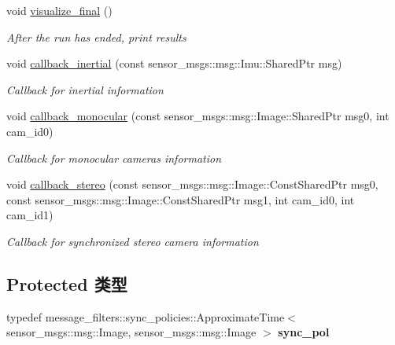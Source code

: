 \begin{DoxyCompactItemize}
void \hyperlink{classov__msckf_1_1ROS2Visualizer_a9126120133a9b4e329c55f0b84c6cf37}{visualize\+\_\+final} ()
\begin{DoxyCompactList}\small\item\em After the run has ended, print results \end{DoxyCompactList}\item 
\mbox{\label{classov__msckf_1_1ROS2Visualizer_afd07ffaa161451684954a6b890de9848}} 
void \hyperlink{classov__msckf_1_1ROS2Visualizer_afd07ffaa161451684954a6b890de9848}{callback\+\_\+inertial} (const sensor\+\_\+msgs\+::msg\+::\+Imu\+::\+Shared\+Ptr msg)
\begin{DoxyCompactList}\small\item\em Callback for inertial information \end{DoxyCompactList}\item 
\mbox{\label{classov__msckf_1_1ROS2Visualizer_a22f4ec95cccb5a98bc9b5c196d3c29cb}} 
void \hyperlink{classov__msckf_1_1ROS2Visualizer_a22f4ec95cccb5a98bc9b5c196d3c29cb}{callback\+\_\+monocular} (const sensor\+\_\+msgs\+::msg\+::\+Image\+::\+Shared\+Ptr msg0, int cam\+\_\+id0)
\begin{DoxyCompactList}\small\item\em Callback for monocular cameras information \end{DoxyCompactList}\item 
\mbox{\label{classov__msckf_1_1ROS2Visualizer_a03578b71069992491971ef4e5c5f3c1d}} 
void \hyperlink{classov__msckf_1_1ROS2Visualizer_a03578b71069992491971ef4e5c5f3c1d}{callback\+\_\+stereo} (const sensor\+\_\+msgs\+::msg\+::\+Image\+::\+Const\+Shared\+Ptr msg0, const sensor\+\_\+msgs\+::msg\+::\+Image\+::\+Const\+Shared\+Ptr msg1, int cam\+\_\+id0, int cam\+\_\+id1)
\begin{DoxyCompactList}\small\item\em Callback for synchronized stereo camera information \end{DoxyCompactList}\end{DoxyCompactItemize}
\subsection*{Protected 类型}
\begin{DoxyCompactItemize}
\item 
\mbox{\label{classov__msckf_1_1ROS2Visualizer_a5151d8bae1c37c9665f9758014c2ffb7}} 
typedef message\+\_\+filters\+::sync\+\_\+policies\+::\+Approximate\+Time$<$ sensor\+\_\+msgs\+::msg\+::\+Image, sensor\+\_\+msgs\+::msg\+::\+Image $>$ {\bfseries sync\+\_\+pol}
\end{DoxyCompactItemize}
